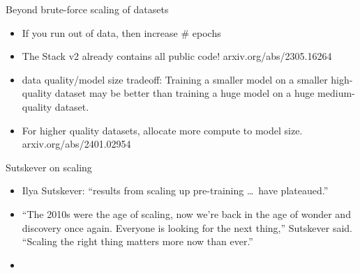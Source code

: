 \documentclass[11pt,compress,t,notes=noshow, xcolor=table]{beamer}
\def\myblue#1{\textcolor{texblue}{#1}}
\begin{document}


\begin{vbframe}{Beyond brute-force scaling of datasets}

\vfill

\begin{itemize}
	\item If you run out of data, then increase \# epochs
        \item The Stack v2
	already contains all public code! arxiv.org/abs/2305.16264
        \item data quality/model size tradeoff: Training
	a smaller model on  a smaller high-quality dataset may be
	better than training a huge model on a huge
	medium-quality dataset.
        \item For higher quality datasets, allocate more
	compute to model size. arxiv.org/abs/2401.02954

\end{itemize}

\vfill

\end{vbframe}


\begin{vbframe}{Sutskever on scaling}

\vfill

\begin{itemize}
\item Ilya Sutskever:
  ``results
	from \myblue{scaling up pre-training} \ldots\
	\myblue{have plateaued}.''
\item “The 2010s were the age of scaling, now we're back in
	the age of wonder and discovery once again. Everyone
	is looking for the next thing,” Sutskever
	said. \myblue{“Scaling the right thing matters more now than ever.”}
\item {}
\end{itemize}


\vfill

\end{vbframe}
\end{document}
